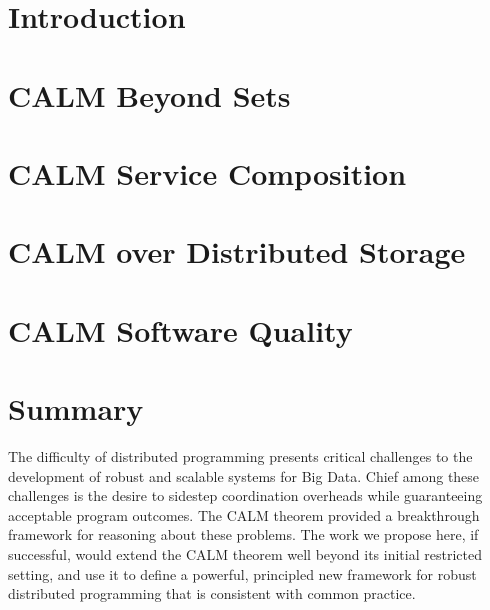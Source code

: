 \documentclass[11pt, us-letter]{article}
\begin{document}


\pagebreak

\section{Introduction}
\label{sec:intro}


\section{CALM Beyond Sets}
\label{sec:lattice}


\section{CALM Service Composition}
\label{sec:soa}


\section{CALM over Distributed Storage}
\label{sec:storage}


\section{CALM Software Quality}
\label{sec:qa}



% 

% 

% 
% 
% 

\section{Summary}
The difficulty of distributed programming presents critical challenges to the development of robust and scalable systems for Big Data.  Chief among these challenges is the desire to sidestep coordination overheads while guaranteeing acceptable program outcomes.  The CALM theorem provided a breakthrough framework for reasoning about these problems.  The work we propose here, if successful, would extend the CALM theorem well beyond its initial restricted setting, and use it to define a powerful, principled new framework for robust distributed programming that is consistent with common practice.  

\newpage


\end{document}
